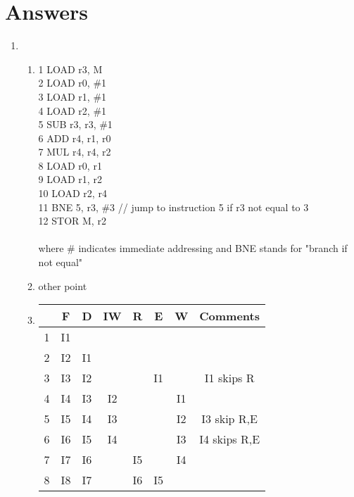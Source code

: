\documentclass[12pt]{article}
\begin{document}
    \section*{Answers}
    \begin{enumerate}
        \item 
        \begin{enumerate}
            \item 1 LOAD r3, M\\
            2 LOAD r0, \#1\\
            3 LOAD r1, \#1\\
            4 LOAD r2, \#1\\
            5 SUB r3, r3, \#1\\
            6 ADD r4, r1, r0\\
            7 MUL r4, r4, r2\\
            8 LOAD r0, r1\\
            9 LOAD r1, r2\\
            10 LOAD r2, r4\\
            11 BNE 5, r3, \#3 // jump to instruction 5 if r3 not equal to 3\\
            12 STOR M, r2\\
            \\
            where \# indicates immediate addressing and BNE stands for "branch if not equal"
            \\
            \item other point
            \item 
            \begin{table}[h!]
            \centering
            \begin{tabular}{||c||c|c|c|c|c|c|c||} 
             \hline
              & F & D & IW & R & E & W & Comments\\ [0.5ex] 
             \hline\hline
             1 & I1 & & & & & & \\ 
             2 & I2 & I1 & & & & &  \\
             3 & I3 & I2 & & & I1 & & I1 skips R\\
             4 & I4 & I3 & I2 & & & I1 & \\
             5 & I5 & I4 & I3 & & & I2 & I3 skip R,E\\  
             6 & I6 & I5 & I4 & & & I3 & I4 skips R,E\\
             7 & I7 & I6 & & I5 & & I4 & \\
             8 & I8 & I7 & & I6 & I5 & & \\

\end{tabular}
\end{table}
\end{enumerate}
\end{enumerate}
\end{document}
